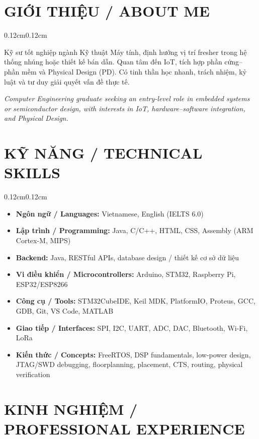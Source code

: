 \documentclass[10pt, letterpaper]{article}
\newenvironment{highlights}{
    \begin{itemize}[
        topsep=0.06cm,
        parsep=0.03cm,
        partopsep=0pt,
        itemsep=0.04cm,
        leftmargin=0.36cm + 10pt
    ]
}{
    \end{itemize}
}
\newenvironment{onecolentry}{
    \begin{adjustwidth}{0.12cm}{0.12cm}
}{
    \end{adjustwidth}
}
\begin{document}
\vspace{0.18cm}

\section{GIỚI THIỆU / ABOUT ME}
\begin{onecolentry}
    Kỹ sư tốt nghiệp ngành Kỹ thuật Máy tính, định hướng vị trí fresher trong hệ thống nhúng hoặc thiết kế bán dẫn. Quan tâm đến IoT, tích hợp phần cứng--phần mềm và Physical Design (PD). Có tinh thần học nhanh, trách nhiệm, kỷ luật và tư duy giải quyết vấn đề thực tế.

    \vspace{0.05cm}
    \textit{Computer Engineering graduate seeking an entry-level role in embedded systems or semiconductor design, with interests in IoT, hardware--software integration, and Physical Design.}
\end{onecolentry}

\section{KỸ NĂNG / TECHNICAL SKILLS}
\begin{onecolentry}
    \begin{highlights}
        \item \textbf{Ngôn ngữ / Languages:} Vietnamese, English (IELTS 6.0)
        \item \textbf{Lập trình / Programming:} Java, C/C++, HTML, CSS, Assembly (ARM Cortex-M, MIPS)
        \item \textbf{Backend:} Java, RESTful APIs, database design / thiết kế cơ sở dữ liệu
        \item \textbf{Vi điều khiển / Microcontrollers:} Arduino, STM32, Raspberry Pi, ESP32/ESP8266
        \item \textbf{Công cụ / Tools:} STM32CubeIDE, Keil MDK, PlatformIO, Proteus, GCC, GDB, Git, VS Code, MATLAB
        \item \textbf{Giao tiếp / Interfaces:} SPI, I2C, UART, ADC, DAC, Bluetooth, Wi-Fi, LoRa
        \item \textbf{Kiến thức / Concepts:} FreeRTOS, DSP fundamentals, low-power design, JTAG/SWD debugging, floorplanning, placement, CTS, routing, physical verification
    \end{highlights}
\end{onecolentry}

\section{KINH NGHIỆM / PROFESSIONAL EXPERIENCE}
\end{document}
